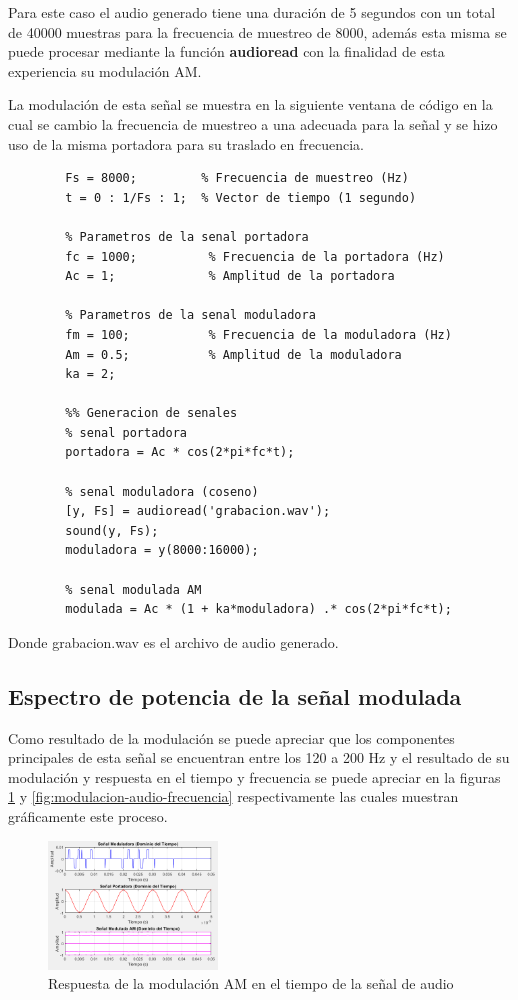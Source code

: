 \documentclass[conference]{IEEEtran}
\begin{document}
	Para este caso el audio generado tiene una duración de 5 segundos con un total de 40000 muestras para la frecuencia de muestreo de 8000, además esta misma se puede procesar mediante la función \textbf{audioread} con la finalidad de esta experiencia su modulación AM.
	
	La modulación de esta señal se muestra en la siguiente ventana de código en la cual se cambio la frecuencia de muestreo a una adecuada para la señal y se hizo uso de la misma portadora para su traslado en frecuencia.
	
	\begin{lstlisting}[caption={Modulaciòn de la señal de audio}, numbers=none]
		%% Parametros de la simulacion
		Fs = 8000;         % Frecuencia de muestreo (Hz)
		t = 0 : 1/Fs : 1;  % Vector de tiempo (1 segundo)
		
		% Parametros de la senal portadora
		fc = 1000;          % Frecuencia de la portadora (Hz)
		Ac = 1;             % Amplitud de la portadora
		
		% Parametros de la senal moduladora
		fm = 100;           % Frecuencia de la moduladora (Hz)
		Am = 0.5;           % Amplitud de la moduladora
		ka = 2;           
		
		%% Generacion de senales
		% senal portadora
		portadora = Ac * cos(2*pi*fc*t);
		
		% senal moduladora (coseno)
		[y, Fs] = audioread('grabacion.wav');
		sound(y, Fs);
		moduladora = y(8000:16000);
		
		% senal modulada AM
		modulada = Ac * (1 + ka*moduladora) .* cos(2*pi*fc*t);
	\end{lstlisting}
	
	Donde grabacion.wav es el archivo de audio generado.
	
	\subsection{Espectro de potencia de la señal modulada}
	
	Como resultado de la modulación se puede apreciar que los componentes principales de esta señal se encuentran entre los 120 a 200 Hz y el resultado de su modulación y respuesta en el tiempo y frecuencia se puede apreciar en la figuras \ref{fig:modulacion-audio-tiempo}  y \ref{fig:modulacion-audio-frecuencia} respectivamente las cuales muestran gráficamente este proceso.
	
	\begin{figure}[h]
		\centering
		\includegraphics[width=0.4\textwidth]{media/modulacion-audio-tiempo}
		\caption{Respuesta de la modulación AM en el tiempo de la señal de audio}
		\label{fig:modulacion-audio-tiempo}
	\end{figure}
	
\end{document}
